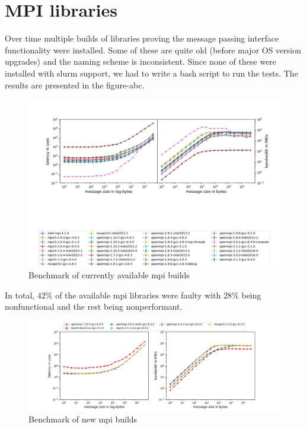 \documentclass[sigconf,authordraft]{acmart}
\begin{document}
\section{MPI libraries}
Over time multiple builds of libraries proving the message passing interface\cite{mpi_3_1} functionality were installed. Some of these are quite old (before major OS version upgrades) and the naming scheme is inconsistent. Since none of these were installed with slurm support, we had to write a bash script to run the tests. The results are presented in the figure-abc.

\begin{figure}[h]
	\centering
	\includegraphics[width=\linewidth]{curr_mpi_combined}
	\caption{Benchmark of currently available mpi builds}
\end{figure}

In total, $42\%$ of the available mpi libraries were faulty with $28\%$ being nonfunctional and the rest being nonperformant.

\begin{figure}[h]
	\centering
	\includegraphics[width=\linewidth]{new_mpi}
	\caption{Benchmark of new mpi builds}
\end{figure}
\end{document}
